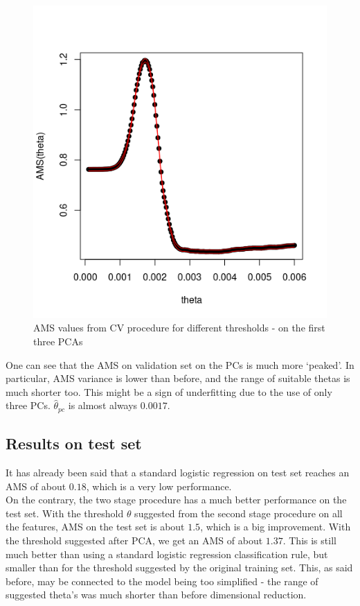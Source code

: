 \documentclass[]{article}
\begin{document}
\begin{figure}[H]
\centering
\includegraphics[scale=0.6]{../Pictures/trainpcatunedtheta.png}
\caption{AMS values from CV procedure for different thresholds - on the first three PCAs}
\label{fig: tuned_pca}
\end{figure}

One can see that the AMS on validation set on the PCs is much more `peaked'. In particular, AMS variance is lower than before, and the range of suitable thetas is much shorter too. This might be a sign of underfitting due to the use of only three PCs. $\hat{\theta}_{pc}$ is almost always $0.0017$.

\subsection{Results on test set}

It has already been said that a standard logistic regression on test set reaches an AMS of about $0.18$, which is a very low performance. \\

On the contrary, the two stage procedure has a much better performance on the test set. With the threshold $\theta$ suggested from the second stage procedure on all the features, AMS on the test set is about $1.5$, which is a big improvement. With the threshold suggested after PCA, we get an AMS of about $1.37$. This is still much better than using a standard logistic regression classification rule, but smaller than for the threshold suggested by the original training set. This, as said before, may be connected to the model being too simplified - the range of suggested theta's was much shorter than before dimensional reduction.\\
\end{document}
